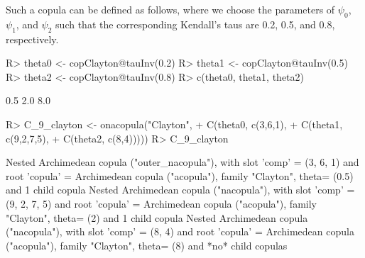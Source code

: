 \documentclass[nojss,article]{jss}
\theoremstyle{mythmstyle}
\begin{document}
Such a copula can be defined as follows, where we choose the parameters of
$\psi_0$, $\psi_1$, and $\psi_2$ such that the corresponding Kendall's taus are
0.2, 0.5, and 0.8, respectively.
\begin{Schunk}
\begin{Sinput}
R> theta0 <- copClayton@tauInv(0.2)
R> theta1 <- copClayton@tauInv(0.5)
R> theta2 <- copClayton@tauInv(0.8)
R> c(theta0, theta1, theta2)
\end{Sinput}
\begin{Soutput}
[1] 0.5 2.0 8.0
\end{Soutput}
\begin{Sinput}
R> C_9_clayton <- onacopula("Clayton",
+                           C(theta0, c(3,6,1),
+                             C(theta1, c(9,2,7,5),
+                               C(theta2, c(8,4)))))
R> C_9_clayton
\end{Sinput}
\begin{Soutput}
Nested Archimedean copula ("outer_nacopula"), with slot 
'comp'   = (3, 6, 1)  and root
'copula' = Archimedean copula ("acopula"), family "Clayton", theta= (0.5)
and 1 child copula
   Nested Archimedean copula ("nacopula"), with slot 
   'comp'   = (9, 2, 7, 5)  and root
   'copula' = Archimedean copula ("acopula"), family "Clayton", theta= (2)
   and 1 child copula
      Nested Archimedean copula ("nacopula"), with slot 
      'comp'   = (8, 4)  and root
      'copula' = Archimedean copula ("acopula"), family "Clayton", theta= (8)
      and *no* child copulas
\end{Soutput}
\end{Schunk}
\end{document}
